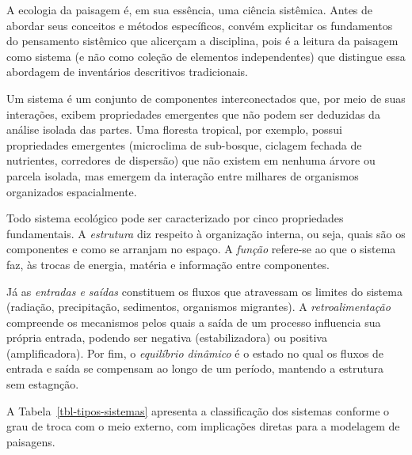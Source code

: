 \documentclass[
  portuguese,
  11pt,
  a4paper,
  open=any]{scrbook}
\begin{document}
A ecologia da paisagem é, em sua essência, uma ciência sistêmica. Antes
de abordar seus conceitos e métodos específicos, convém explicitar os
fundamentos do pensamento sistêmico que alicerçam a disciplina, pois é a
leitura da paisagem como sistema (e não como coleção de elementos
independentes) que distingue essa abordagem de inventários descritivos
tradicionais.

Um sistema é um conjunto de componentes interconectados que, por meio de
suas interações, exibem propriedades emergentes que não podem ser
deduzidas da análise isolada das partes. Uma floresta tropical, por
exemplo, possui propriedades emergentes (microclima de sub-bosque,
ciclagem fechada de nutrientes, corredores de dispersão) que não existem
em nenhuma árvore ou parcela isolada, mas emergem da interação entre
milhares de organismos organizados espacialmente.

Todo sistema ecológico pode ser caracterizado por cinco propriedades
fundamentais. A \emph{estrutura} diz respeito à organização interna, ou
seja, quais são os componentes e como se arranjam no espaço. A
\emph{função} refere-se ao que o sistema faz, às trocas de energia,
matéria e informação entre componentes.

Já as \emph{entradas e saídas} constituem os fluxos que atravessam os
limites do sistema (radiação, precipitação, sedimentos, organismos
migrantes). A \emph{retroalimentação} compreende os mecanismos pelos
quais a saída de um processo influencia sua própria entrada, podendo ser
negativa (estabilizadora) ou positiva (amplificadora). Por fim, o
\emph{equilíbrio dinâmico} é o estado no qual os fluxos de entrada e
saída se compensam ao longo de um período, mantendo a estrutura sem
estagnção.

A Tabela~\ref{tbl-tipos-sistemas} apresenta a classificação dos sistemas
conforme o grau de troca com o meio externo, com implicações diretas
para a modelagem de paisagens.
\end{document}
